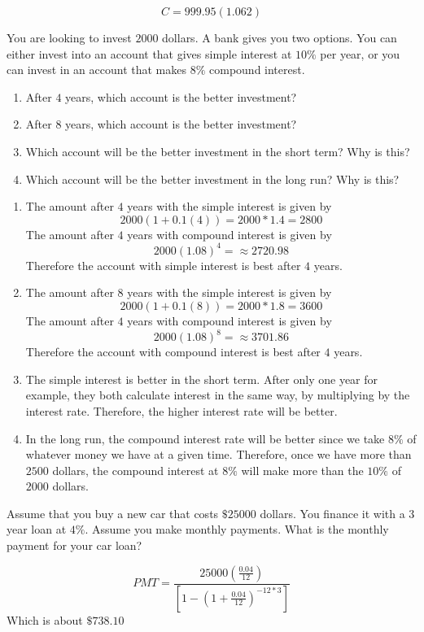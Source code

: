 \documentclass[addpoints,12pt]{exam}
\theoremstyle{definition}
\begin{document}
\begin{questions}
\begin{solution}
\begin{enumerate}[label = \alph*)]
				\[
				C = 999.95 (1.062)
				\]
    \end{enumerate}
\end{solution}\vfill
\question You are looking to invest $2000$ dollars. A bank gives you two options. You can either invest into an account that gives simple interest at $10\%$ per year, or you can invest in an account that makes $8\% $ compound interest. 
\begin{enumerate}[label = \alph*)]
	\item After $4$ years, which account is the better investment? 
	\item After $8$ years, which account is the better investment? 
	\item Which account will be the better investment in the short term? Why is this? 
	\item Which account will be the better investment in the long run? Why is this? 
\end{enumerate}
\begin{solution}
    \begin{enumerate}[label = \alph*)]
			\item The amount after $4$ years with the simple interest is given by 
				\[
				2000 (1+0.1(4)) = 2000*1.4 = 2800
				\]
				The amount after $4$ years with compound interest is given by 
				\[
					2000(1.08)^{4}= \approx 2720.98
				\]
				Therefore the account with simple interest is best after $4$ years. 
				\item The amount after $8$ years with the simple interest is given by 
				\[
				2000 (1+0.1(8)) = 2000*1.8 = 3600
				\]
				The amount after $4$ years with compound interest is given by 
				\[
					2000(1.08)^{8}= \approx 3701.86
				\]
				Therefore the account with compound interest is best after $4$ years. 
			\item The simple interest is better in the short term. After only one year for example, they both calculate interest in the same way, by multiplying by the interest rate. Therefore, the higher interest rate will be better. 
			\item In the long run, the compound interest rate will be better since we take $8\%$ of whatever money we have at a given time. Therefore, once we have more than $2500$ dollars, the compound interest at $8\%$ will make more than the $10\%$ of $2000$ dollars. 
    \end{enumerate}
\end{solution}
    \question Assume that you buy a new car that costs $\$25000$ dollars. You finance it with a $3$ year loan at $4\%$. Assume you make monthly payments. What is the monthly payment for your car loan? 
		\begin{solution}
	    \[
	PMT = \frac{25000(\frac{0.04}{12})}{\left[1-\left(1+\frac{0.04}{12}\right)^{-12*3}\right]}
	    \]
			Which is about $\$738.10$
		\end{solution}
\end{questions}

    
\end{document}
